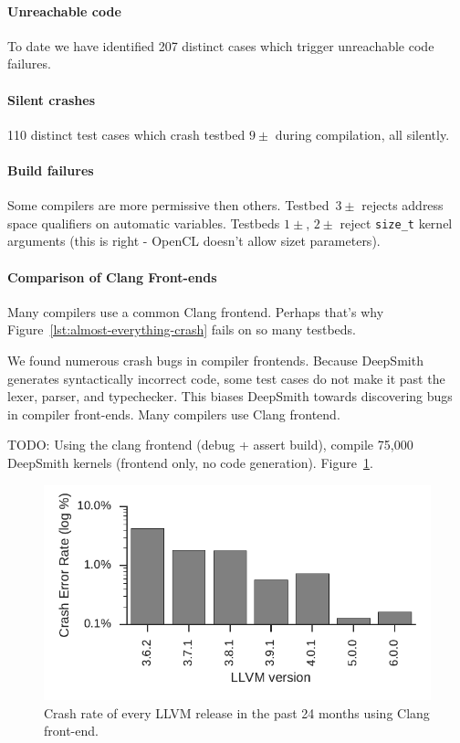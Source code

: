 \paragraph{Unreachable code} To date we have identified 207 distinct cases which trigger unreachable code failures. 


\paragraph{Silent crashes} 110 distinct test cases which crash testbed $9\pm$ during compilation, all silently.


\paragraph{Build failures} Some compilers are more permissive then others. Testbed~$3\pm$ rejects address space qualifiers on automatic variables. Testbeds $1\pm$, $2\pm$ reject \texttt{size\_t} kernel arguments (this is right - OpenCL doesn't allow sizet parameters).


\paragraph{Comparison of Clang Front-ends}%

Many compilers use a common Clang frontend. Perhaps that's why Figure~\ref{lst:almost-everything-crash} fails on so many testbeds.

We found numerous crash bugs in compiler frontends. Because DeepSmith generates syntactically incorrect code, some test cases do not make it past the lexer, parser, and typechecker. This biases DeepSmith towards discovering bugs in compiler front-ends. Many compilers use Clang frontend.

TODO: Using the clang frontend (debug + assert build), compile 75,000 DeepSmith kernels (frontend only, no code generation). Figure~\ref{fig:clangs}.

\begin{figure}
  \centering %
  \includegraphics[width=.95\columnwidth]{build/img/clang-crashes}%
  \caption{%
    Crash rate of every LLVM release in the past 24 months using Clang front-end.%
  }%
  \label{fig:clangs} %
\end{figure}

